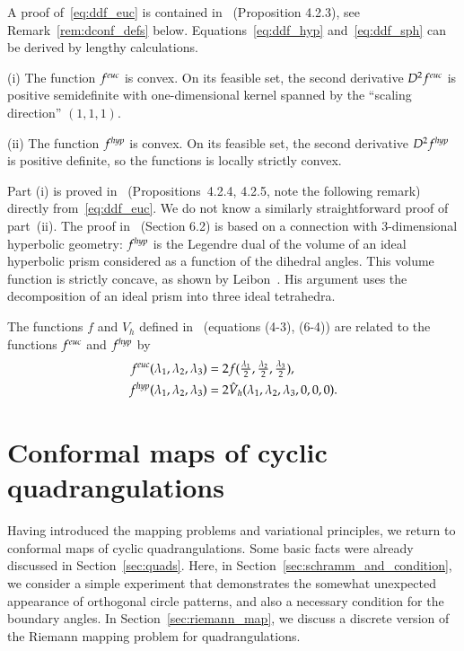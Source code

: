 \documentclass[Thesis]{subfiles}
\begin{document}
A proof of~\eqref{eq:ddf_euc} is contained in~\cite{BPS2015:dconf}
(Proposition 4.2.3), see Remark~\ref{rem:dconf_defs} below.
Equations~\eqref{eq:ddf_hyp} and~\eqref{eq:ddf_sph} can be derived by
lengthy calculations.

\begin{proposition}
  \label{prop:f_convex}
  (i) The function $f^{\euc}$ is convex. On its feasible set, the
  second derivative $D^{2}f^{\euc}$ is positive semidefinite with
  one-dimensional kernel spanned by the ``scaling direction''\/
  $(1,1,1)$. 

  (ii) The function $f^{\mathit{hyp}}$ is convex. On its feasible
  set, the second derivative $D^{2}f^{\mathit{hyp}}$ is positive definite, so
  the functions is locally strictly convex.
\end{proposition}

Part (i) is proved in~\cite{BPS2015:dconf} (Propositions~4.2.4, 4.2.5,
note the following remark)
directly from~\eqref{eq:ddf_euc}. We do not know a similarly
straightforward proof of part~(ii). The proof in~\cite{BPS2015:dconf}
(Section 6.2) is based on a connection with 3-dimensional hyperbolic
geometry: $f^{\mathit{hyp}}$ is the Legendre dual of the volume of an ideal
hyperbolic prism considered as a function of the dihedral angles. This
volume function is strictly concave, as shown by
Leibon~\cite{leibon_2002}. His argument uses the decomposition of an
ideal prism into three ideal tetrahedra.

\begin{remark}
  \label{rem:dconf_defs}
  The functions $f$ and $\hat V_{h}$ defined in~\cite{BPS2015:dconf}
  (equations (4-3), (6-4)) are related to the functions $f^{\euc}$ and
  $f^{\mathit{hyp}}$ by
  \begin{align}
    \label{eq:f_dconf}
    f^{\euc}(\lambda_{1},\lambda_{2},\lambda_{3})
    &=
    2f(\tfrac{\lambda_{1}}{2},
    \tfrac{\lambda_{2}}{2}, \tfrac{\lambda_{3}}{2}),\\
    f^{\hyp}(\lambda_{1},\lambda_{2},\lambda_{3})
    &=
    2\hat V_{h}(\lambda_{1},\lambda_{2},\lambda_{3},0,0,0).
  \end{align}

\end{remark}

\section{Conformal maps of cyclic quadrangulations}
\label{sec:quadrangulations}

Having introduced the mapping problems and variational principles, we
return to conformal maps of cyclic quadrangulations. Some basic facts
were already discussed in Section~\ref{sec:quads}. Here, in
Section~\ref{sec:schramm_and_condition}, we consider a simple
experiment that demonstrates the somewhat unexpected appearance of
orthogonal circle patterns, and also a necessary condition for the
boundary angles. In Section~\ref{sec:riemann_map}, we discuss a
discrete version of the Riemann mapping problem for quadrangulations.
\end{document}
